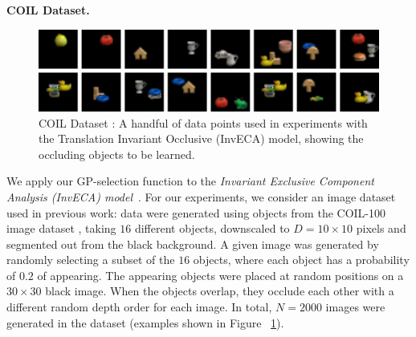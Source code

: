
\textbf{COIL Dataset.}
%
\begin{figure}[t!]%
\centering
\includegraphics[width=1\textwidth]{inveca/dataSamples.png}%
\caption{COIL Dataset \citep{coil100}: 
A handful of data points used in experiments with the Translation Invariant Occlusive (InvECA) model, showing the occluding objects to be learned.
}
\label{fig:inveca-data}
\end{figure}
%
We apply our GP-selection function to the \emph{Invariant Exclusive Component Analysis (InvECA) model}~\citep{DaiLucke2012b,DaiEtAl2013}.
For our experiments, we consider an image dataset used in previous work: data were generated using objects from the COIL-100 image dataset \citep{coil100}, taking $16$ different objects, downscaled to $D=10 \times 10$ pixels and segmented out from the black background.
A given image was generated by randomly selecting a subset of the $16$ objects, where each object has a probability of $0.2$ of appearing.
The appearing objects were placed at random positions on a $30 \times 30$ black image.
When the objects overlap, they occlude each other with a different random depth order for each image.
In total, $N=2000$ images were generated in the dataset (examples shown in Figure~ \ref{fig:inveca-data}).%

